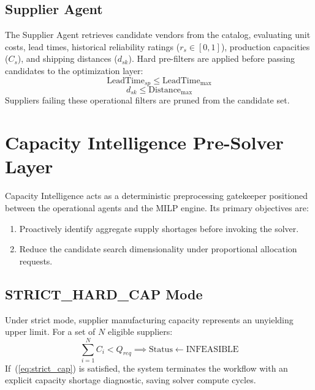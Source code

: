 \documentclass[conference]{IEEEtran}
\begin{document}
\subsection{Supplier Agent}
The Supplier Agent retrieves candidate vendors from the catalog, evaluating unit costs, lead times, historical reliability ratings ($r_s \in [0, 1]$), production capacities ($C_s$), and shipping distances ($d_{sk}$). Hard pre-filters are applied before passing candidates to the optimization layer:
\begin{equation}
\text{LeadTime}_{sp} \le \text{LeadTime}_{\max}
\label{eq:lead_filter}
\end{equation}
\begin{equation}
d_{sk} \le \text{Distance}_{\max}
\label{eq:dist_filter}
\end{equation}
Suppliers failing these operational filters are pruned from the candidate set.

\section{Capacity Intelligence Pre-Solver Layer}
Capacity Intelligence acts as a deterministic preprocessing gatekeeper positioned between the operational agents and the MILP engine. Its primary objectives are:
\begin{enumerate}
    \item Proactively identify aggregate supply shortages before invoking the solver.
    \item Reduce the candidate search dimensionality under proportional allocation requests.
\end{enumerate}

\subsection{STRICT\_HARD\_CAP Mode}
Under strict mode, supplier manufacturing capacity represents an unyielding upper limit. For a set of $N$ eligible suppliers:
\begin{equation}
\sum_{i=1}^{N} C_i < Q_{req} \implies \text{Status} \leftarrow \text{INFEASIBLE}
\label{eq:strict_cap}
\end{equation}
If~(\ref{eq:strict_cap}) is satisfied, the system terminates the workflow with an explicit capacity shortage diagnostic, saving solver compute cycles.
\end{document}
